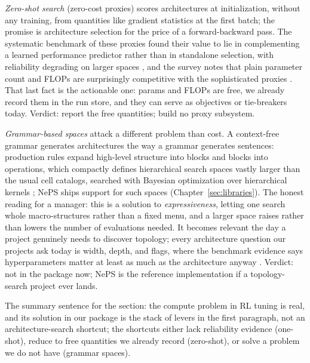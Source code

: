 \emph{Zero-shot search} (zero-cost proxies) scores architectures at
initialization, without any training, from quantities like gradient
statistics at the first batch; the promise is architecture selection
for the price of a forward-backward pass. The systematic benchmark of
these proxies found their value to lie in complementing a learned
performance predictor rather than in standalone selection, with
reliability degrading on larger spaces
\citep{krishnakumar2022nasbenchsuite}, and the survey notes that plain
parameter count and FLOPs are surprisingly competitive with the
sophisticated proxies \citep{white2023nas1000}. That last fact is the
actionable one: params and FLOPs are free, we already record them in
the run store, and they can serve as objectives or tie-breakers today.
Verdict: report the free quantities; build no proxy subsystem.

\emph{Grammar-based spaces} attack a different problem than cost.
A context-free grammar generates architectures the way a grammar
generates sentences: production rules expand high-level structure into
blocks and blocks into operations, which compactly defines hierarchical
search spaces vastly larger than the usual cell catalogs, searched with
Bayesian optimization over hierarchical kernels
\citep{schrodi2023grammar}; NePS ships support for such spaces
(Chapter~\ref{sec:libraries}). The honest reading for a manager: this
is a solution to \emph{expressiveness}, letting one search whole
macro-structures rather than a fixed menu, and a larger space raises
rather than lowers the number of evaluations needed. It becomes
relevant the day a project genuinely needs to discover topology; every
architecture question our projects ask today is width, depth, and
flags, where the benchmark evidence says hyperparameters matter at
least as much as the architecture anyway \citep{bansal2022jahs}.
Verdict: not in the package now; NePS is the reference implementation
if a topology-search project ever lands.

The summary sentence for the section: the compute problem in RL tuning
is real, and its solution in our package is the stack of levers in the
first paragraph, not an architecture-search shortcut; the shortcuts
either lack reliability evidence (one-shot), reduce to free quantities
we already record (zero-shot), or solve a problem we do not have
(grammar spaces).

